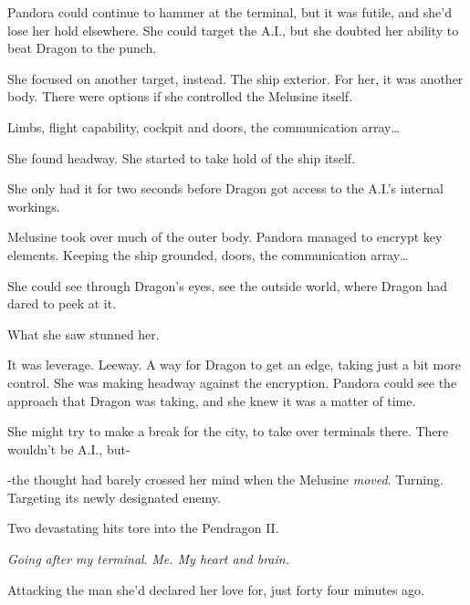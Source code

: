 Pandora could continue to hammer at the terminal, but it was futile, and she'd lose her hold elsewhere.  She could target the A.I.,  but she doubted her ability to beat Dragon to the punch.



She focused on another target, instead.  The ship exterior.  For her, it was another body.  There were options if she controlled the Melusine itself.



Limbs, flight capability, cockpit and doors, the communication array\ldots



She found headway.  She started to take hold of the ship itself.



She only had it for two seconds before Dragon got access to the A.I.'s internal workings.



Melusine took over much of the outer body.  Pandora managed to encrypt key elements.  Keeping the ship grounded, doors, the communication array\ldots



She could see through Dragon's eyes, see the outside world, where Dragon had dared to peek at it.



What she saw stunned her.



It was leverage.  Leeway.  A way for Dragon to get an edge, taking just a bit more control.  She was making headway against the encryption.  Pandora could see the approach that Dragon was taking, and she knew it was a matter of time.



She might try to make a break for the city, to take over terminals there.  There wouldn't be A.I., but-



-the thought had barely crossed her mind when the Melusine \emph{moved}.  Turning.  Targeting its newly designated enemy.



Two devastating hits tore into the Pendragon II.



\emph{Going after my terminal}.  \emph{Me.  My heart and brain.}



Attacking the man she'd declared her love for, just forty four minutes ago.



